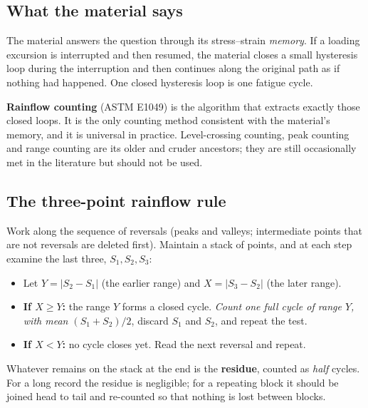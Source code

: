 \documentclass[11pt,a4paper]{article}
\begin{document}
\subsection{What the material says}
The material answers the question through its stress--strain \emph{memory}. If a loading excursion is interrupted and then resumed, the material closes a small hysteresis loop during the interruption and then continues along the original path as if nothing had happened. One closed hysteresis loop is one fatigue cycle.

\textbf{Rainflow counting} (ASTM E1049) is the algorithm that extracts exactly those closed loops. It is the only counting method consistent with the material's memory, and it is universal in practice. Level-crossing counting, peak counting and range counting are its older and cruder ancestors; they are still occasionally met in the literature but should not be used.

\subsection{The three-point rainflow rule}
Work along the sequence of reversals (peaks and valleys; intermediate points that are not reversals are deleted first). Maintain a stack of points, and at each step examine the last three, $S_1,S_2,S_3$:
\begin{itemize}[nosep]
  \item Let $Y=|S_2-S_1|$ (the earlier range) and $X=|S_3-S_2|$ (the later range).
  \item \textbf{If $X\ge Y$:} the range $Y$ forms a closed cycle. \emph{Count one full cycle of range $Y$, with mean $(S_1+S_2)/2$}, discard $S_1$ and $S_2$, and repeat the test.
  \item \textbf{If $X<Y$:} no cycle closes yet. Read the next reversal and repeat.
\end{itemize}
Whatever remains on the stack at the end is the \textbf{residue}, counted as \emph{half} cycles. For a long record the residue is negligible; for a repeating block it should be joined head to tail and re-counted so that nothing is lost between blocks.
\end{document}
